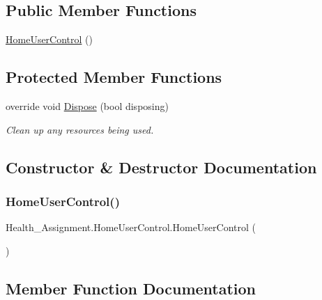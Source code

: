 \subsection*{Public Member Functions}
\begin{DoxyCompactItemize}
\item 
\hyperlink{class_health___assignment_1_1_home_user_control_a3156e847e0f71bf65f8dc5025ac4f224}{Home\+User\+Control} ()
\end{DoxyCompactItemize}
\subsection*{Protected Member Functions}
\begin{DoxyCompactItemize}
\item 
override void \hyperlink{class_health___assignment_1_1_home_user_control_a29889440118e3948e0cd4250220d92a1}{Dispose} (bool disposing)
\begin{DoxyCompactList}\small\item\em Clean up any resources being used. \end{DoxyCompactList}\end{DoxyCompactItemize}


\subsection{Constructor \& Destructor Documentation}
\mbox{\label{class_health___assignment_1_1_home_user_control_a3156e847e0f71bf65f8dc5025ac4f224}} 
\subsubsection{\texorpdfstring{Home\+User\+Control()}{HomeUserControl()}}
{\footnotesize\ttfamily Health\+\_\+\+Assignment.\+Home\+User\+Control.\+Home\+User\+Control (\begin{DoxyParamCaption}{ }\end{DoxyParamCaption})\hspace{0.3cm}{\ttfamily [inline]}}



\subsection{Member Function Documentation}
\mbox{\label{class_health___assignment_1_1_home_user_control_a29889440118e3948e0cd4250220d92a1}} 
